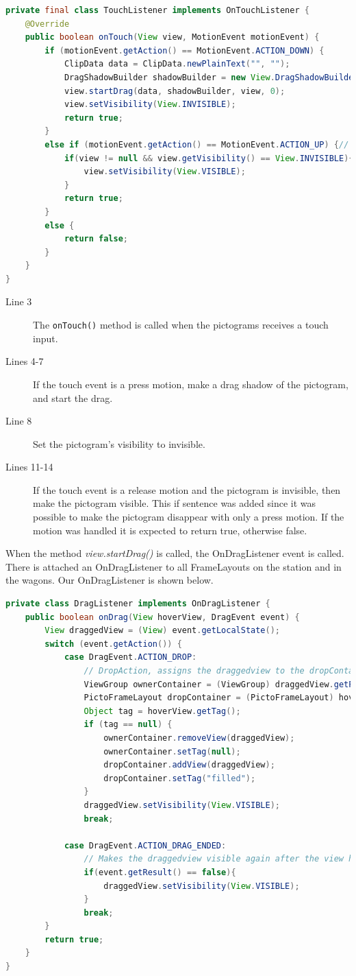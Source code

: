\begin{lstlisting}[language=java,firstnumber=1,caption={Our TouchListener},label=lst:ourtouchlistener] 
private final class TouchListener implements OnTouchListener {
	@Override
	public boolean onTouch(View view, MotionEvent motionEvent) {
		if (motionEvent.getAction() == MotionEvent.ACTION_DOWN) {
			ClipData data = ClipData.newPlainText("", "");
			DragShadowBuilder shadowBuilder = new View.DragShadowBuilder(view);
			view.startDrag(data, shadowBuilder, view, 0);
			view.setVisibility(View.INVISIBLE);
			return true;
		}
		else if (motionEvent.getAction() == MotionEvent.ACTION_UP) {// prevents that a pictogram disappears if only pressed and no drag
			if(view != null && view.getVisibility() == View.INVISIBLE){
				view.setVisibility(View.VISIBLE);
			}
			return true;
		}
		else {
			return false;
		}
	}
}
\end{lstlisting}
\begin{description}
\item[Line 3] The \lstinline|onTouch()| method is called when the pictograms receives a touch input.
\item[Lines 4-7] If the touch event is a press motion, make a drag shadow of the pictogram, and start the drag.
\item[Line 8] Set the pictogram's visibility to invisible.
\item[Lines 11-14] If the touch event is a release motion and the pictogram is invisible, then make the pictogram visible. This if sentence was added since it was possible to make the pictogram disappear with only a press motion. If the motion was handled it is expected to return true, otherwise false.
\end{description}
When the method \textit{view.startDrag()} is called, the OnDragListener event is called. There is attached an OnDragListener to all FrameLayouts on the station and in the wagons. Our OnDragListener is shown below.
\begin{lstlisting}[language=java,firstnumber=1,caption={Our DragListener},label=lst:ourdraglistener] 
private class DragListener implements OnDragListener {
	public boolean onDrag(View hoverView, DragEvent event) {
	    View draggedView = (View) event.getLocalState();
		switch (event.getAction()) {
			case DragEvent.ACTION_DROP:
				// DropAction, assigns the draggedview to the dropContainer if, the dropContainer does not already contain a pictogram.
				ViewGroup ownerContainer = (ViewGroup) draggedView.getParent();
				PictoFrameLayout dropContainer = (PictoFrameLayout) hoverView;
				Object tag = hoverView.getTag();
				if (tag == null) {
					ownerContainer.removeView(draggedView);
					ownerContainer.setTag(null);
					dropContainer.addView(draggedView);
					dropContainer.setTag("filled");
				}
				draggedView.setVisibility(View.VISIBLE);
				break;

			case DragEvent.ACTION_DRAG_ENDED:
				// Makes the draggedview visible again after the view has been moved or if drop wasn't valid.
				if(event.getResult() == false){
					draggedView.setVisibility(View.VISIBLE);
				}
				break;
		}
		return true;
	}
}
\end{lstlisting}
